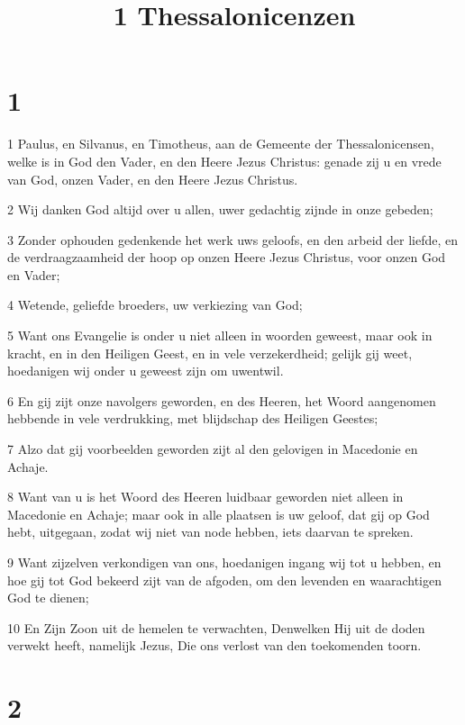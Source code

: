 

\title{1 Thessalonicenzen}



\chapter{1}

\par 1 Paulus, en Silvanus, en Timotheus, aan de Gemeente der Thessalonicensen, welke is in God den Vader, en den Heere Jezus Christus: genade zij u en vrede van God, onzen Vader, en den Heere Jezus Christus.
\par 2 Wij danken God altijd over u allen, uwer gedachtig zijnde in onze gebeden;
\par 3 Zonder ophouden gedenkende het werk uws geloofs, en den arbeid der liefde, en de verdraagzaamheid der hoop op onzen Heere Jezus Christus, voor onzen God en Vader;
\par 4 Wetende, geliefde broeders, uw verkiezing van God;
\par 5 Want ons Evangelie is onder u niet alleen in woorden geweest, maar ook in kracht, en in den Heiligen Geest, en in vele verzekerdheid; gelijk gij weet, hoedanigen wij onder u geweest zijn om uwentwil.
\par 6 En gij zijt onze navolgers geworden, en des Heeren, het Woord aangenomen hebbende in vele verdrukking, met blijdschap des Heiligen Geestes;
\par 7 Alzo dat gij voorbeelden geworden zijt al den gelovigen in Macedonie en Achaje.
\par 8 Want van u is het Woord des Heeren luidbaar geworden niet alleen in Macedonie en Achaje; maar ook in alle plaatsen is uw geloof, dat gij op God hebt, uitgegaan, zodat wij niet van node hebben, iets daarvan te spreken.
\par 9 Want zijzelven verkondigen van ons, hoedanigen ingang wij tot u hebben, en hoe gij tot God bekeerd zijt van de afgoden, om den levenden en waarachtigen God te dienen;
\par 10 En Zijn Zoon uit de hemelen te verwachten, Denwelken Hij uit de doden verwekt heeft, namelijk Jezus, Die ons verlost van den toekomenden toorn.

\chapter{2}

